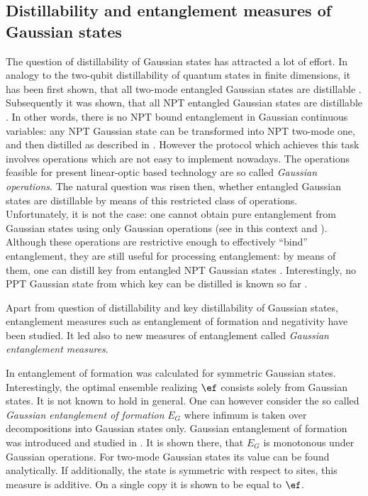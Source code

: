 \documentclass[rmp,12pt,preprint]{revtex4-2}
\begin{document}
\subsection{Distillability and entanglement measures of Gaussian states}
\label{subsec:gaussian-measures}

The question of distillability of Gaussian states has attracted a lot
of effort. In analogy to the two-qubit distillability of quantum
states in finite dimensions, it has been first shown, that all
two-mode entangled Gaussian states are distillable
\cite{G2D_GieDuaCirZol}. Subsequently it was shown, that all NPT
entangled Gaussian states are distillable \cite{GallD_GieDuaCirZol}.
In other words, there is no NPT bound entanglement in Gaussian
continuous variables: any NPT Gaussian state can be transformed into
NPT two-mode one, and then distilled as described in
\cite{G2D_GieDuaCirZol}. However the protocol which achieves this task
involves operations which are not easy to implement nowadays.  The
operations feasible for present linear-optic based technology are so
called {\it Gaussian operations}. The natural question was risen then,
whether entangled Gaussian states are distillable by means of this
restricted class of operations. Unfortunately, it is not the case: one
cannot obtain pure entanglement from Gaussian states using only
Gaussian operations \cite{GnonD_GieCir} (see in this context
\cite{GnonD_Fiu} and \cite{GnonD_EisSchPle}). Although these
operations are restrictive enough to effectively ``bind''
entanglement, they are still useful for processing entanglement: by
means of them, one can distill key from entangled NPT Gaussian states
\cite{GKD_NavBaeCirLewSanAci}. Interestingly, no PPT Gaussian state
from which key can be distilled is known so far
\cite{GPPTnonD_Nav_Aci}.

Apart from question of distillability and key distillability of
Gaussian states, entanglement measures such as entanglement of
formation and negativity have been studied. It led also to new
measures of entanglement called {\it Gaussian entanglement measures}.

In \cite{GEform_GieVolKruWerCir} entanglement of formation was
calculated for symmetric Gaussian states. Interestingly, the optimal
ensemble realizing $\ef$ consists solely from Gaussian states. It is
not known to hold in general. One can however consider the so called
{\it Gaussian entanglement of formation} $E_G$ where infimum is taken
over decompositions into Gaussian states only. Gaussian entanglement
of formation was introduced and studied in
\cite{GEform_GieVolKruWerCir}. It is shown there, that $E_G$ is
monotonous under Gaussian operations. For two-mode Gaussian states its
value can be found analytically. If additionally, the state is
symmetric with respect to sites, this measure is additive. On a single
copy it is shown to be equal to $\ef$.
\end{document}
